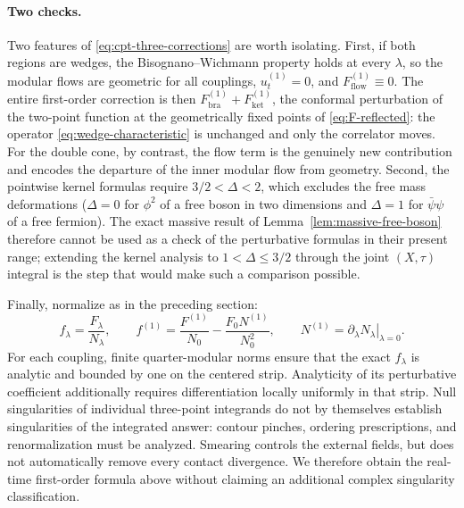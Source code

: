 \documentclass[a4paper,11pt]{article}
\theoremstyle{definition}
\begin{document}
\paragraph{Two checks.}
Two features of \eqref{eq:cpt-three-corrections} are worth isolating. First, if both regions are wedges, the Bisognano--Wichmann property holds at every $\lambda$, so the modular flows are geometric for all couplings, $u^{(1)}_t=0$, and $F^{(1)}_{\mathrm{flow}}\equiv0$. The entire first-order correction is then $F^{(1)}_{\mathrm{bra}}+F^{(1)}_{\mathrm{ket}}$, the conformal perturbation of the two-point function at the geometrically fixed points of \eqref{eq:F-reflected}: the operator \eqref{eq:wedge-characteristic} is unchanged and only the correlator moves. For the double cone, by contrast, the flow term is the genuinely new contribution and encodes the departure of the inner modular flow from geometry. Second, the pointwise kernel formulas require $3/2<\Delta<2$, which excludes the free mass deformations ($\Delta=0$ for $\phi^2$ of a free boson in two dimensions and $\Delta=1$ for $\bar\psi\psi$ of a free fermion). The exact massive result of Lemma~\ref{lem:massive-free-boson} therefore cannot be used as a check of the perturbative formulas in their present range; extending the kernel analysis to $1<\Delta\le3/2$ through the joint $(X,\tau)$ integral is the step that would make such a comparison possible.

Finally, normalize as in the preceding section:
\begin{equation}
 f_\lambda=\frac{F_\lambda}{N_\lambda},
 \qquad f^{(1)}=\frac{F^{(1)}}{N_0}-\frac{F_0N^{(1)}}{N_0^2},
 \qquad N^{(1)}=\left.\partial_\lambda N_\lambda\right|_{\lambda=0}.
 \label{eq:cpt-normalized-correction}
\end{equation}
For each coupling, finite quarter-modular norms ensure that the exact $f_\lambda$ is analytic and bounded by one on the centered strip. Analyticity of its perturbative coefficient additionally requires differentiation locally uniformly in that strip. Null singularities of individual three-point integrands do not by themselves establish singularities of the integrated answer: contour pinches, ordering prescriptions, and renormalization must be analyzed. Smearing controls the external fields, but does not automatically remove every contact divergence. We therefore obtain the real-time first-order formula above without claiming an additional complex singularity classification.

\end{document}
